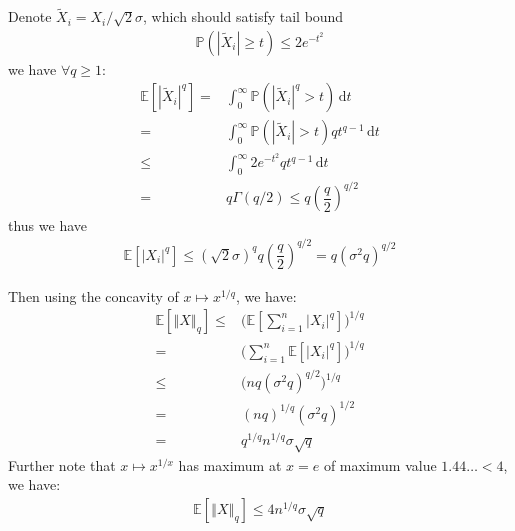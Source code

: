 \documentclass[11pt,a4paper]{ctexart}
\numberwithin{equation}{section}%
\begin{document}
Denote $ \tilde{X}_i=X_i/\sqrt{2}\sigma  $, which should satisfy tail bound 
\begin{align*}
    \mathbb{P}\left( \left\vert \tilde{X}_i \right\vert \geq t \right)  \leq 2e^{-t^2}
\end{align*}
we have $ \forall q\geq 1 $:
\begin{align*}
     \mathbb{E}\left[ \left\vert \tilde{X}_i \right\vert ^q \right] =& \int_{0}^\infty \mathbb{P}\left( \left\vert \tilde{X}_i \right\vert ^q > t \right) \,\mathrm{d}t\\
    =& \int_{0}^\infty \mathbb{P}\left( \left\vert \tilde{X}_i \right\vert > t \right) qt^{q-1} \,\mathrm{d}t\\
    \leq & \int_{0}^\infty 2e^{-t^2}qt^{q-1} \,\mathrm{d}t\\
    =& q \Gamma (q/2) \leq q(\dfrac{ q }{ 2 } )^{q/2}
\end{align*}
thus we have
\begin{align*}
    \mathbb{E}\left[ \left\vert X_i \right\vert ^q \right] \leq (\sqrt{2}\sigma )^q q(\dfrac{ q }{ 2 } )^{q/2} = q (\sigma^2 q)^{q/2}
\end{align*}



Then using the concavity of $ x\mapsto x^{1/q} $, we have:
\begin{align*}
    \mathbb{E}\left[ \left\Vert X \right\Vert _q \right]  \leq & \bigl(\mathbb{E}\left[ \sum_{i=1}^n \left\vert X_i \right\vert ^q \right] \bigr)^{1/q}\\
    =& \bigl(\sum_{i=1}^n \mathbb{E}\left[ \left\vert X_i \right\vert ^q \right] \bigr)^{1/q}\\
    \leq & \bigl(nq (\sigma^2 q)^{q/2} \bigr)^{1/q}\\
    =& (nq)^{1/q} (\sigma^2 q)^{1/2}\\
    =& q^{1/q} n^{1/q} \sigma \sqrt{q}
\end{align*}
Further note that $ x\mapsto x^{1/x} $ has maximum at $ x=e $ of maximum value $ 1.44\dots <4 $, we have:
\begin{align*}
    \mathbb{E}\left[ \left\Vert X \right\Vert _q \right]  \leq 4n^{1/q} \sigma \sqrt{q}
\end{align*}
\end{document}
